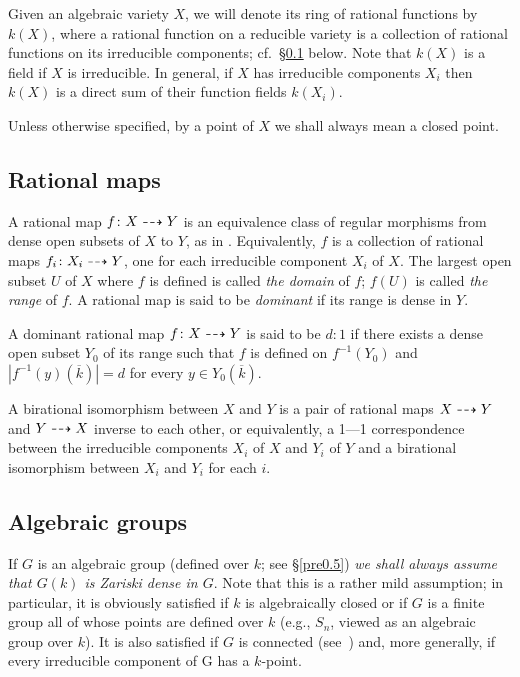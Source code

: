 Given an algebraic variety $X$, we will denote its ring of rational functions
by $k(X)$, where a rational function on a reducible variety is 
a collection of rational functions on its irreducible components; 
cf.~\S\ref{prel1} below.
Note that $k(X)$ is a field if $X$ is irreducible. In general,
if $X$ has irreducible components $X_i$ then
$k(X)$ is a direct sum of their function fields $k(X_i)$.

Unless otherwise specified, by a point of $X$ we shall always mean 
a closed point.

\subsection{Rational maps} \label{prel1}
A rational map $f \colon X\dasharrow Y$ is an equivalence class of regular
morphisms from dense open subsets of $X$ to $Y$, as in 
\cite[D\'efinition~7.1.2]{ega1}.
Equivalently, $f$ is a collection of rational maps
$f_i\colon X_i\dasharrow Y$, one for each irreducible component $X_i$ of $X$. 
The largest open subset $U$ of $X$ where $f$ is defined is called {\em the 
domain} of $f$; $f(U)$ is called {\em the range} of $f$. A rational map
is said to be {\em dominant} if its range is dense in $Y$.

A dominant rational map $f \colon X\dasharrow Y$  
is said to be $d:1$ if there exists a dense open subset $Y_0$ of its range
such that $f$ is defined on $f^{-1}(Y_0)$ and
$|f^{-1}(y)(\overline{k})| = d$ for every $y \in Y_0(\overline{k})$.

A birational isomorphism between $X$ and $Y$ is a pair of rational maps
$X\dasharrow Y$ and $Y\dasharrow X$ inverse to each other, or equivalently, 
a 1---1 correspondence between the irreducible components $X_i$ of $X$ 
and $Y_i$ of $Y$
and a birational isomorphism between $X_i$ and $Y_i$ for each $i$.

\subsection{Algebraic groups} \label{prel1.5} 
If $G$ is an algebraic group (defined over $k$; see \S\ref{pre0.5})
{\em we shall always assume that $G(k)$
is Zariski dense in $G$}. Note that this is a rather mild assumption; 
in particular, it is obviously satisfied if $k$ is algebraically closed
or if $G$ is a finite group all of whose points are defined over $k$
(e.g., $S_n$, viewed as an algebraic group over $k$).
It is also satisfied if $G$ is connected 
(see~\cite[Theorem~34.4(d)]{humphreys}) and, more generally, if every
irreducible component of G has a $k$-point. 

